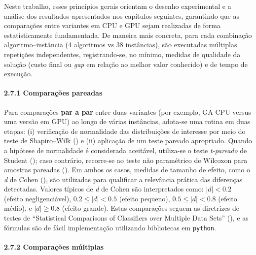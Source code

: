 Neste trabalho, esses princípios gerais orientam o desenho experimental
e a análise dos resultados apresentados nos capítulos seguintes,
garantindo que as comparações entre variantes em CPU e GPU sejam
realizadas de forma estatisticamente fundamentada. De maneira mais
concreta, para cada combinação algoritmo--instância (4 algoritmos vs 38
instâncias), são executadas múltiplas repetições independentes,
registrando-se, no mínimo, medidas de qualidade da solução (custo final
ou \emph{gap} em relação ao melhor valor conhecido) e de tempo de
execução.

\paragraph{2.7.1 Comparações
pareadas}\label{sec-271-comparacoes-pareadas}

Para comparações \textbf{par a par} entre duas variantes (por exemplo,
GA-CPU versus uma versão em GPU) ao longo de várias instâncias, adota-se
uma rotina em duas etapas: (i) verificação de normalidade das
distribuições de interesse por meio do teste de Shapiro--Wilk
() e (ii) aplicação de um teste
pareado apropriado. Quando a hipótese de normalidade é considerada
aceitável, utiliza-se o teste \emph{t-pareado} de Student
(); caso contrário, recorre-se ao
teste não paramétrico de Wilcoxon para amostras pareadas
(). Em ambos os casos, medidas
de tamanho de efeito, como o \emph{d} de Cohen
(), são utilizadas para
qualificar a relevância prática das diferenças detectadas. Valores
típicos de \emph{d} de Cohen são interpretados como: \(|d| < 0.2\)
(efeito negligenciável), \(0.2 \le |d| < 0.5\) (efeito pequeno),
\(0.5 \le |d| < 0.8\) (efeito médio), e \(|d| \ge 0.8\) (efeito grande).
Estas comparações seguem as diretrizes de testes de ``Statistical
Comparisons of Classifiers over Multiple Data Sets''
(), e as fórmulas são de fácil
implementação utilizando bibliotecas em \texttt{python}.

\paragraph{2.7.2 Comparações
múltiplas}\label{sec-272-comparacoes-multiplas}

